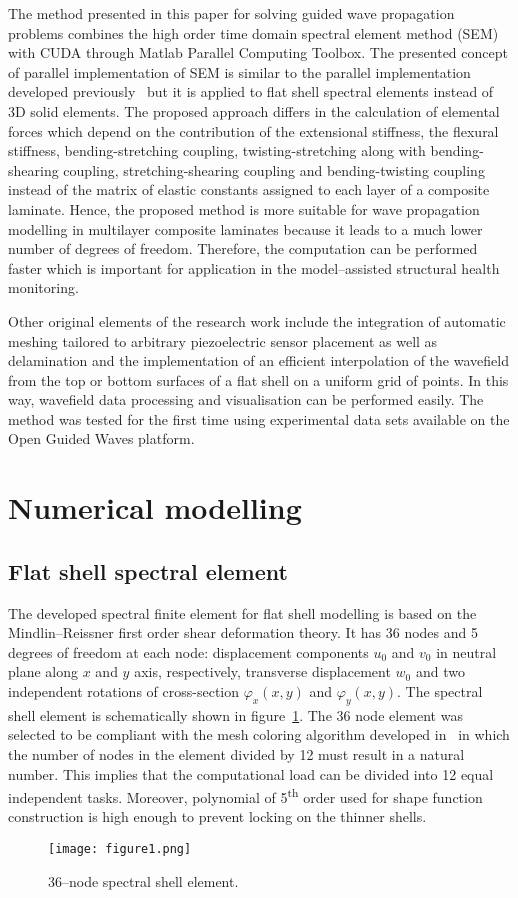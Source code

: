 \documentclass[12pt]{iopart}
\begin{document}
The method presented in this paper for solving guided wave propagation problems combines the high order time domain spectral element method (SEM) with CUDA through Matlab Parallel Computing Toolbox. The presented concept of parallel implementation of SEM is similar to the parallel implementation developed previously~\cite{Kudela2016} but it is applied to flat shell spectral elements instead of 3D solid elements. The proposed approach differs in the calculation of elemental forces which depend on the contribution of the extensional stiffness, the flexural stiffness, bending-stretching coupling,  twisting-stretching along with bending-shearing coupling, stretching-shearing coupling and bending-twisting coupling instead of the matrix of elastic constants assigned to each layer of a composite laminate. Hence, the proposed method is more suitable for wave propagation modelling in multilayer composite laminates because it leads to a much lower number of degrees of freedom. Therefore, the computation can be performed faster which is important for application in the model--assisted structural health monitoring. 

Other original elements of the research work include the integration of automatic meshing tailored to arbitrary piezoelectric sensor placement as well as delamination and the implementation of an efficient interpolation of the wavefield from the top or bottom surfaces of a flat shell on a uniform grid of points. In this way, wavefield data processing and visualisation can be performed easily. The method was tested for the first time using experimental data sets available on the Open Guided Waves platform.

\section{Numerical modelling}

\subsection{Flat shell spectral element}

The developed spectral finite element for flat shell modelling is based on the Mindlin--Reissner first order shear deformation theory. It has 36 nodes and 5 degrees of freedom at each node: displacement components $u_0$ and $v_0$ in neutral plane along $x$ and $y$ axis, respectively, transverse displacement $w_0$ and two independent rotations of cross-section $\varphi_x(x,y)$ and $\varphi_y(x,y)$. The spectral shell element is schematically shown in figure~\ref{fig:spectral_shell_element}. The 36 node element was selected to be compliant with the mesh coloring algorithm developed in~\cite{Kudela2016} in which the number of nodes in the element divided by 12 must result in a natural number. This implies that the computational load can be divided into 12 equal independent tasks. Moreover, polynomial of 5\textsuperscript{th} order used for shape function construction is high enough to prevent locking on the thinner shells.
\begin{figure} [h!]
	\centering
	\texttt{[image: figure1.png]}	
	\caption{36--node spectral shell element.}
	\label{fig:spectral_shell_element}
\end{figure}
\end{document}
